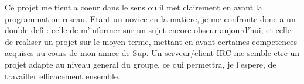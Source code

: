 Ce projet me tient a coeur dans le sens ou il met clairement en avant la programmation reseau. Etant un novice en la matiere, je me confronte donc a un double defi : celle de m'informer sur un sujet encore obscur aujourd'hui, et celle de realiser un projet sur le moyen terme, mettant en avant certaines competences acquises au cours de mon annee de Sup. Un serveur/client IRC me semble etre un projet adapte au niveau general du groupe, ce qui permettra, je l'espere, de travailler efficacement ensemble.            
